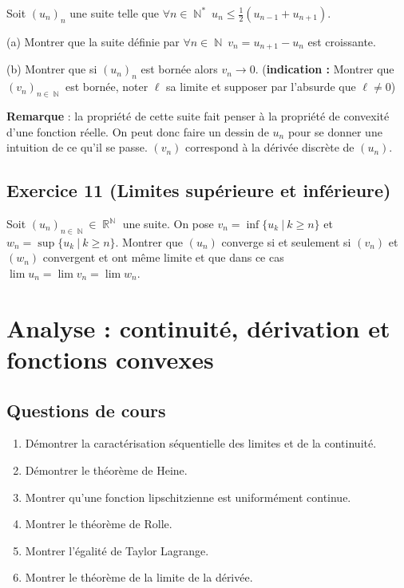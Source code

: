 \documentclass{article}
\DeclareMathOperator{\R}{\mathbb{R}}
\DeclareMathOperator{\N}{\mathbb{N}}
\begin{document}
Soit $(u_n)_n$ une suite telle que $\forall n \in \N^* \ u_{n} \leqslant \displaystyle\frac{1}{2}(u_{n-1} + u_{n+1})$.  

(a) Montrer que la suite définie par $\forall n \in \N \ v_n = u_{n+1} - u_n$ est croissante. 

(b) Montrer que si $(u_n)_n$ est bornée alors $v_n \to 0$. (\textbf{indication :} Montrer que $(v_n)_{n\in \N}$ est bornée, noter $\ell$ sa limite et supposer par l'absurde que $\ell \neq 0$) 

\textbf{Remarque} : la propriété de cette suite fait penser à la propriété de convexité d'une fonction réelle. On peut donc faire un dessin de $u_n$ pour se donner une intuition de ce qu'il se passe. $(v_n)$  correspond à la dérivée discrète de $(u_n)$. 

\subsection*{Exercice 11 (Limites supérieure et inférieure)} 

Soit $(u_n)_{n\in\N} \in \R^{\N}$ une suite. On pose $v_n = \inf \{ u_k \ | \  k \geqslant n \}$ et $w_n = \sup\{ u_k \ | \  k\geqslant n \}$. Montrer que $(u_n)$ converge si et seulement si $(v_n)$ et $(w_n)$ convergent et ont même limite et que dans ce cas $\lim{u_n}=\lim{v_n} = \lim{w_n}$.  

\clearpage

\section{Analyse : continuité, dérivation et fonctions convexes} 

\subsection*{Questions de cours} 
\begin{enumerate} 

\item Démontrer la caractérisation séquentielle des limites et de la continuité. 

\item Démontrer le théorème de Heine. 

\item Montrer qu'une fonction lipschitzienne est uniformément continue. 

\item Montrer le théorème de Rolle. 

\item Montrer l'égalité de Taylor Lagrange. 

\item Montrer le théorème de la limite de la dérivée. 
\end{enumerate}
\end{document}
